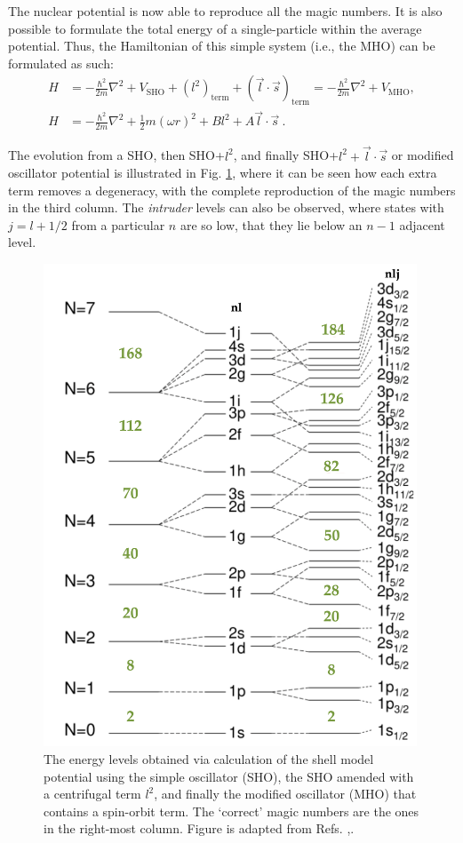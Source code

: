 The nuclear potential is now able to reproduce all the magic numbers. It is also possible to formulate the total energy of a single-particle within the average potential. Thus, the Hamiltonian of this simple system (i.e., the MHO) can be formulated as such:
\begin{align}
    H&=-\frac{\hbar^2}{2m}\nabla^2+V_\text{SHO}+(l^2)_\text{term}+(\vec{l}\cdot\vec{s})_\text{term}=-\frac{\hbar^2}{2m}\nabla^2+V_\text{MHO} , \nonumber\\
    H&=-\frac{\hbar^2}{2m}\nabla^2+\frac{1}{2}m(\omega r)^2+Bl^2+A\vec{l}\cdot\vec{s}\ .
\end{align}

The evolution from a SHO, then SHO+$l^2$, and finally SHO+$l^2+\vec{l}\cdot\vec{s}$ or modified oscillator potential is illustrated in Fig. \ref{energy-levels-mho}, where it can be seen how each extra term removes a degeneracy, with the complete reproduction of the magic numbers in the third column. The \emph{intruder} levels can also be observed, where states with $j=l+1/2$ from a particular $n$ are so low, that they lie below an $n-1$ adjacent level.
\begin{figure}
    \centering
    \includegraphics[width=0.99\textwidth]{Chapters/Figures/SM_level_scheme.png}
    \caption{The energy levels obtained via calculation of the shell model potential using the simple oscillator (SHO), the SHO amended with a centrifugal term $l^2$, and finally the modified oscillator (MHO) that contains a spin-orbit term. The `correct' magic numbers are the ones in the right-most column. Figure is adapted from Refs. \cite{matta2017exotic},\cite{krane1991introductory}.}
    \label{energy-levels-mho}
\end{figure}

